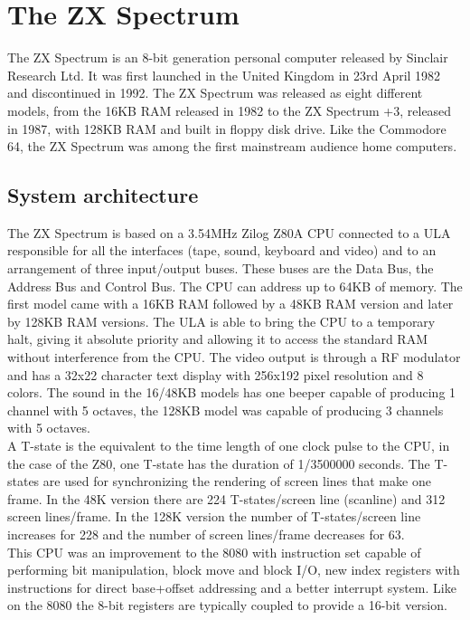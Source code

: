 \section{The ZX Spectrum}
The ZX Spectrum is an 8-bit generation personal computer released by Sinclair Research Ltd. It was first launched in the United Kingdom in 23rd April 1982 and discontinued in 1992. The ZX Spectrum was released as eight different models, from the 16KB RAM released in 1982 to the ZX Spectrum +3, released in 1987, with 128KB RAM and built in floppy disk drive. Like the Commodore 64, the ZX Spectrum was among the first mainstream audience home computers.

\subsection{System architecture}
The ZX Spectrum is based on a 3.54MHz Zilog Z80A CPU connected to a ULA responsible for all the interfaces (tape, sound, keyboard and video) and to an arrangement of three input/output buses. These buses are the Data Bus, the Address Bus and Control Bus. The CPU can address up to 64KB of memory. The first model came with a 16KB RAM followed by a 48KB RAM version and later by 128KB RAM versions. The ULA is able to bring the CPU to a temporary halt, giving it absolute priority and allowing it to access the standard RAM without interference from the CPU. The video output is through a RF modulator and has a 32x22 character text display with 256x192 pixel resolution and 8 colors. The sound in the 16/48KB models has one beeper capable of producing 1 channel with 5 octaves, the 128KB model was capable of producing 3 channels with 5 octaves.\\
\indent A T-state is the equivalent to the time length of one clock pulse to the CPU, in the case of the Z80, one T-state has the duration of 1/3500000 seconds. The T-states are used for synchronizing the rendering of screen lines that make one frame. In the 48K version there are 224 T-states/screen line (scanline) and 312 screen lines/frame. In the 128K version the number of T-states/screen line increases for 228 and the number of screen lines/frame decreases for 63.\\
\indent This CPU was an improvement to the 8080 with instruction set capable of performing bit manipulation, block move and block I/O, new index registers with instructions for direct base+offset addressing and a better interrupt system. Like on the 8080 the 8-bit registers are typically coupled to provide a 16-bit version.

